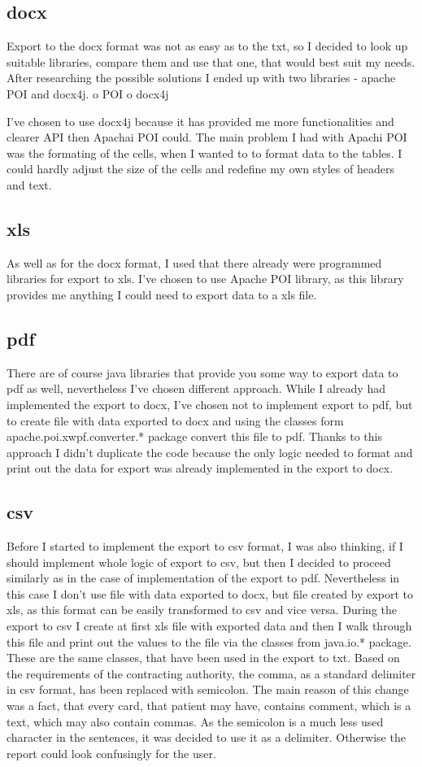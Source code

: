 \documentclass[thesis=B,english]{FITthesis}[2012/10/20]
\begin{document}
\subsection{docx}
Export to the docx format was not as easy as to the txt, so I decided to look up suitable libraries, compare them and use that one, that would best suit my needs. After researching the possible solutions I ended up with two libraries - apache POI and docx4j.
o POI
o docx4j

I've chosen to use docx4j because it has provided me more functionalities and clearer API then Apachai POI could. The main problem I had with Apachi POI was the formating of the cells, when I wanted to to format data to the tables. I could hardly adjust the size of the cells and redefine my own styles of headers and text.
\subsection{xls}
As well as for the docx format, I used that there already were programmed libraries for export to xls.
I've chosen to use Apache POI library, as this library provides me anything I could need to export data to  a xls file.
\subsection{pdf}
There are of course java libraries that provide you some way to export data to pdf as well, nevertheless I've chosen different approach. While I already had implemented the export to docx, I've chosen not to implement export to pdf, but to create file with data exported to docx and using the classes form apache.poi.xwpf.converter.* package convert this file to pdf. Thanks to this approach I didn't duplicate the code because the only logic needed to format and print out the data for export was already implemented in the export to docx. 
\subsection{csv}
Before I started to implement the export to csv format, I was also thinking, if I should implement whole logic of export to csv, but then I decided to proceed similarly as in the case of implementation of the export to pdf. Nevertheless in this case I don't use file with data exported to docx, but file created by export to xls, as this format can be easily transformed to csv and vice versa. During the export to csv I create at first xls file with exported data and then I walk through this file and print out the values to the file via the classes from java.io.* package. These are the same classes, that have been used in the export to txt. Based on the requirements of the contracting authority, the comma, as a standard delimiter in csv format, has been replaced with semicolon. The main reason of this change was a fact, that every card, that patient may have, contains comment, which is a text, which may also contain commas. As the semicolon is a much less used character in the sentences, it was decided to use it as a delimiter. Otherwise the report could look confusingly for the user.
\end{document}
